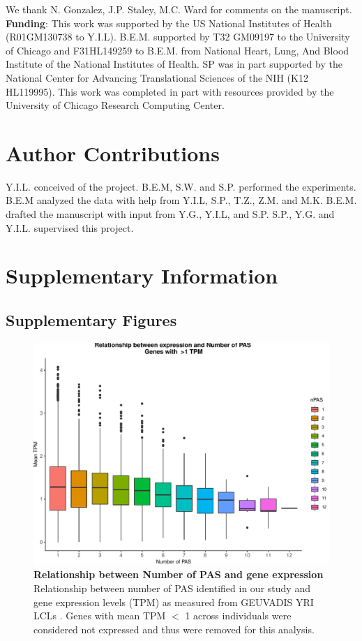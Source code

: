 We thank N. Gonzalez, J.P. Staley, M.C. Ward for comments on the manuscript. \textbf{Funding}: This work was supported by the US National Institutes of Health (R01GM130738 to  Y.I.L). B.E.M. supported by T32 GM09197 to the University of Chicago and F31HL149259 to B.E.M. from National Heart, Lung, And Blood Institute of the National Institutes of Health. SP was in part supported by the National Center for Advancing Translational Sciences of the NIH (K12 HL119995). This work was completed in part with resources provided by the University of Chicago Research Computing Center.

\section{Author Contributions}\label{ch02-author-contributions}

 Y.I.L. conceived of the project. B.E.M, S.W. and S.P. performed the experiments. B.E.M analyzed the data with help from Y.I.L, S.P., T.Z., Z.M. and M.K. B.E.M. drafted the manuscript with input from Y.G., Y.I.L, and S.P. S.P., Y.G. and Y.I.L. supervised this project. 

\clearpage
\section{Supplementary Information}\label{ch02-supplementary-information}

\subsection{Supplementary Figures}\label{ch02-supplementary-figures}
\clearpage

\begin{figure}[!htb]
\centering
\includegraphics[width=5in]{img/ch02/Fig1_figuresupplement1.pdf}
\caption[Relationship between Number of PAS and gene expression]{\textbf{Relationship between Number of PAS and gene expression} Relationship between number of PAS identified in our study and gene expression levels (TPM) as measured from GEUVADIS YRI LCLs \citep{lappalainen_transcriptome_2013}. Genes with mean TPM $<$ 1 across individuals were considered not expressed and thus were removed for this analysis.}
\label{fig:ch02-pas-exp}
\end{figure}
\clearpage

